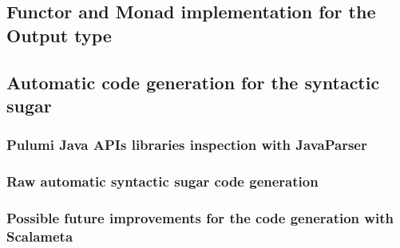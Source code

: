 \subsection{Functor and Monad implementation for the Output type}

\subsection{Automatic code generation for the syntactic sugar}

\subsubsection{Pulumi Java APIs libraries inspection with JavaParser}

\subsubsection{Raw automatic syntactic sugar code generation}

\subsubsection{Possible future improvements for the code generation with Scalameta}
